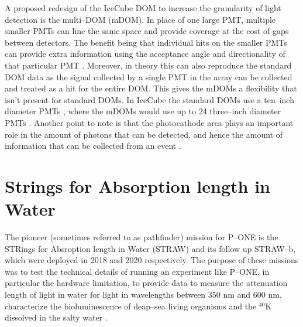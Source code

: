 A proposed redesign of the IceCube DOM to increase the granularity of light detection is the multi--DOM (mDOM). In place of one large PMT, multiple smaller PMTs can line the same space and provide coverage at the cost of gaps between detectors. The benefit being that individual hits on the smaller PMTs can provide extra information using the acceptance angle and directionality of that particular PMT \cite{mpmt}. Moreover, in theory this can also reproduce the standard DOM data as the signal collected by a single PMT in the array can be collected and treated as a hit for the entire DOM. This gives the mDOMs a flexibility that isn't present for standard DOMs. In IceCube the standard DOMs use a ten--inch diameter PMTs \cite{icecube}, where the mDOMs would use up to 24 three--inch diameter PMTs \cite{mpmt}. Another point to note is that the photocathode area plays an important role in the amount of photons that can be detected, and hence the amount of information that can be collected from an event \cite{icecube}. 

\section{Strings for Absorption length in Water}
\label{sec:straw}

The pioneer (sometimes referred to as pathfinder) mission for P--ONE is the STRings for Absroption length in Water (STRAW) and its follow up STRAW--b, which were deployed in 2018 and 2020 respectively. The purpose of these missions was to test the technical details of running an experiment like P--ONE, in particular the hardware limitation, to provide data to measure the attenuation length of light in water for light in wavelengths between 350 nm and 600 nm, characterize the bioluminescence of deap--sea living organisms and the $^{40}$K dissolved in the salty water \cite{straw}.

